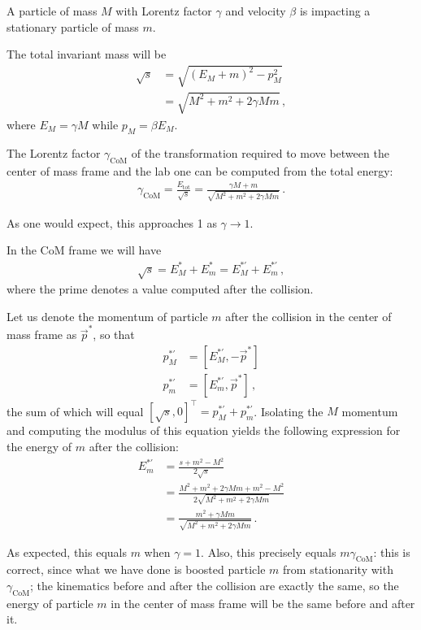 \documentclass[main.tex]{subfiles}
\begin{document}
\begin{extracontent}
A particle of mass \(M\) with Lorentz factor \(\gamma \) and velocity \(\beta \) is impacting a stationary particle of mass \(m\). 

The total invariant mass will be 
%
\begin{align}
\sqrt{s} &= \sqrt{(E_M + m)^2  - p_M^2}  \\
&= \sqrt{M^2 + m^2 + 2 \gamma Mm}
\,,
\end{align}
%
where \(E_M = \gamma M\) while \(p_M = \beta E_M\).

The Lorentz factor \(\gamma _{\text{CoM}}\) of the transformation required to move between the center of mass frame and the lab one can be computed from the total energy: 
%
\begin{align}
\gamma _{\text{CoM}} = \frac{E_{\text{tot}}}{\sqrt{s}} = \frac{\gamma M + m}{\sqrt{M^2 + m^2 + 2 \gamma Mm}}
\,.
\end{align}

As one would expect, this approaches 1 as \(\gamma \to 1\). 

In the CoM frame we will have 
%
\begin{align}
\sqrt{s} = E^{*}_M + E^{*}_m = E^{* \prime}_M + E^{* \prime}_m
\,,
\end{align}
%
where the prime denotes a value computed after the collision. 

Let us denote the momentum of particle \(m\) after the collision in the center of mass frame as \(\vec{p}^{*}\), so that 
%
\begin{align}
p_M^{* \prime} &= [E^{* \prime}_M, -\vec{p}^{*}] \\
p_m^{* \prime} &= [E^{* \prime}_m, \vec{p}^{*}]
\,,
\end{align}
%
the sum of which will equal \([\sqrt{s}, 0]^{\top} = p^{*\prime}_M + p^{*\prime}_m\).
Isolating the \(M\) momentum and computing the modulus of this equation yields the following expression for the energy of \(m\) after the collision:
%
\begin{align}
E_m^{*\prime} &= \frac{s + m^2 - M^2}{2 \sqrt{s}}  \\
&= \frac{M^2 + m^2 + 2 \gamma Mm + m^2 - M^2}{2 \sqrt{M^2 + m^2 + 2 \gamma Mm}}  \\
&= \frac{m^2 + \gamma Mm}{\sqrt{M^2 + m^2 + 2 \gamma Mm}}
\,.
\end{align}

As expected, this equals \(m\) when \(\gamma = 1\). 
Also, this precisely equals \(m \gamma _{\text{CoM}}\): this is correct, since what we have done is boosted particle \(m\) from stationarity with \(\gamma _{\text{CoM}}\); the kinematics before and after the collision are exactly the same, so the energy of particle \(m\) in the center of mass frame will be the same before and after it. 


\end{extracontent}
\end{document}
